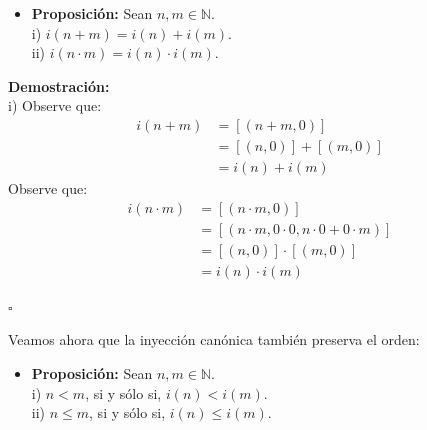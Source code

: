 \documentclass[10 pt]{article}
\begin{document}
\begin{itemize}
    \item \Large{\textbf{Proposición:} Sean $n,m \in \mathbb N$. \\

    i) $i(n+m)=i(n)+i(m)$. \\

    ii) $i(n \cdot m)=i(n) \cdot i(m)$.} \\
\end{itemize}

\Large{\textbf{Demostración:} \\

i) Observe que:}
\begin{align*}
    i(n+m)&=[(n+m,0)] \\
    &=[(n,0)]+[(m,0)] \\
    &=i(n)+i(m) 
\end{align*}
\Large{Observe que:}
\begin{align*}
    i(n \cdot m)&=[(n \cdot m,0)] \\
    &=[(n \cdot m,0 \cdot 0,n \cdot0+0 \cdot m)] \\
    &=[(n,0)] \cdot [(m,0)] \\
    &=i(n) \cdot i(m)
\end{align*}

\begin{flushright}
    $\square$
\end{flushright}

\Large{Veamos ahora que la inyección canónica también preserva el orden:} \\

\begin{itemize}
    \item \Large{\textbf{Proposición:} Sean $n,m \in \mathbb N$. \\

    i) $n<m$, si y sólo si, $i(n)<i(m)$. \\

    ii) $n \leq m$, si y sólo si, $i(n) \leq i(m)$.} \\
\end{itemize}
\end{document}
